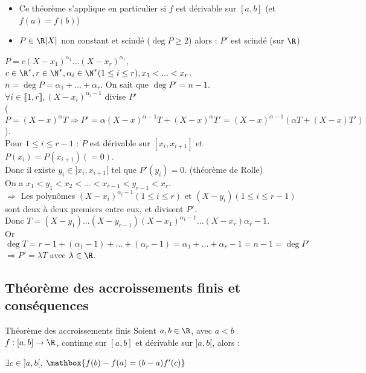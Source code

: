 \documentclass[12pt,a4paper]{report}
\begin{document}
\begin{remarque}
\begin{itemize}
    \item Ce théorème s'applique en particulier si $f$ est dérivable sur $[a,b]$ (et $f(a)=f(b)$)
    \item $P\in \R[X]$ non constant et scindé ($\deg P \geq 2$) alors : $P'$ est scindé (sur $\R$)
\end{itemize}
\end{remarque}

\begin{demo}{}
$P = c(X-x_1)^{\alpha_1} ... (X-x_r)^{\alpha_r}$, $c \in \R^*, r \in \N^*, \alpha_i \in \N^* (1 \leq i \leq r), x_1 < ... < x_r$. \\
$n = \deg P = \alpha_1 + ... + \alpha_r$. On sait que $\deg P' = n-1$. \\
$\forall i \in \llbracket 1,r \rrbracket, (X-x_i)^{\alpha_i-1}$ divise $P'$ \\
($P = (X-x)^{\alpha}T \Longrightarrow P' = \alpha (X-x)^{\alpha-1}T + (X-x)^{\alpha}T' = (X-x)^{\alpha-1}(\alpha T+(X-x)T')$). \\
Pour $1 \leq i \leq r-1$ : $P$ est dérivable sur $[x_i,x_{i+1}]$ et $P(x_i) = P(x_{i+1}) (=0)$. \\
Donc il existe $y_i \in ]x_i,x_{i+1}[$ tel que $P'(y_i) = 0$. (théorème de Rolle) \\
On a $x_1 < y_1 < x_2 < ... < x_{r-1} < y_{r-1} < x_r$. \\
$\Longrightarrow$ Les polynômes $(X-x_i)^{\alpha_i-1} (1 \leq i \leq r)$ et $(X-y_i) (1 \leq i \leq r-1)$ sont deux à deux premiers entre eux, et divisent $P'$. \\
Donc $T = (X-y_1)...(X-y_{r-1})(X-x_1)^{\alpha_1-1} ... (X-x_r){\alpha_r-1}$. \\
Or $\deg T = r-1 + (\alpha_1-1) + ... + (\alpha_r-1) = \alpha_1 + ... + \alpha_r - 1 = n-1 = \deg P'$ \\
$\Longrightarrow P' = \lambda T$ avec $\lambda \in \R$.

\end{demo}

\subsection{Théorème des accroissements finis et conséquences }

\begin{theoreme}{Théorème des accroissements finis \footnotemark}{}
Soient $a,b \in \R$, avec $a<b$\\
$f:[a,b]\to \R$, continue sur $[a,b]$ et dérivable sur $]a,b[$, alors : 
\begin{center}
    $\exists c \in ]a,b[$, $\mathbox{f(b)-f(a)=(b-a)f'(c)}$
\end{center}
\end{theoreme}
\end{document}
